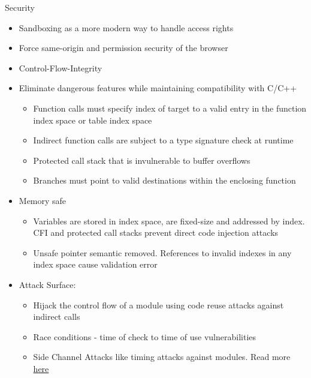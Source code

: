 \documentclass{beamer}
\begin{document}
\begin{frame}{Security}
    \begin{itemize}
        \item Sandboxing as a more modern way to handle access rights
        \item Force same-origin and permission security of the browser
        \item Control-Flow-Integrity
        \item Eliminate dangerous features while maintaining compatibility with C/C++
        \begin{itemize}
            \item Function calls must specify index of target to a valid entry in the function index space or table index space
            \item Indirect function calls are subject to a type signature check at runtime
            \item Protected call stack that is invulnerable to buffer overflows
            \item Branches must point to valid destinations within the enclosing function
        \end{itemize}
        \item Memory safe
        \begin{itemize} 
            \item Variables are stored in index space, are fixed-size and addressed by index. CFI and protected call stacks prevent direct code injection attacks
            \item Unsafe pointer semantic removed. References to invalid indexes in any index space cause validation error
        \end{itemize}
        \item Attack Surface: 
        \begin{itemize}
            \item Hijack the control flow of a module using code reuse attacks against indirect calls
            \item Race conditions - time of check to time of use vulnerabilities 
            \item Side Channel Attacks like timing attacks against modules. Read more \href{https://github.com/tc39/ecmascript_sharedmem/blob/master/issues/TimingAttack.md}{here}
        \end{itemize}
    \end{itemize}
\end{frame}
\end{document}
